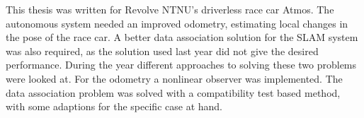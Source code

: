 This thesis was written for Revolve NTNU's driverless race car Atmos. The autonomous system needed an improved odometry, estimating local changes in the pose of the race car. A better data association solution for the \gls{SLAM} system was also required, as the solution used last year did not give the desired performance. During the year different approaches to solving these two problems were looked at. For the odometry a nonlinear observer was implemented. The data association problem was solved with a compatibility test based method, with some adaptions for the specific case at hand.
